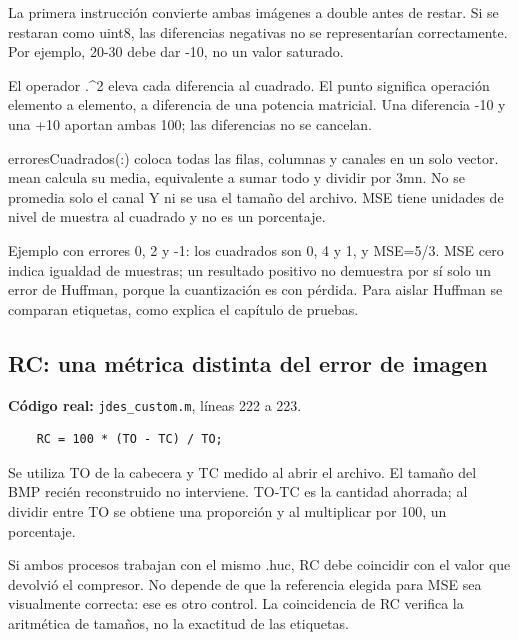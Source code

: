 \documentclass[11pt,a4paper,oneside]{report}
\begin{document}
La primera instrucción convierte ambas imágenes a double antes de restar.
Si se restaran como uint8, las diferencias negativas no se representarían
correctamente. Por ejemplo, 20-30 debe dar -10, no un valor saturado.

El operador .\^{}2 eleva cada diferencia al cuadrado. El punto significa
operación elemento a elemento, a diferencia de una potencia matricial.
Una diferencia -10 y una +10 aportan ambas 100; las diferencias no se cancelan.

erroresCuadrados(:) coloca todas las filas, columnas y canales en un solo
vector. mean calcula su media, equivalente a sumar todo y dividir por 3mn.
No se promedia solo el canal Y ni se usa el tamaño del archivo. MSE tiene
unidades de nivel de muestra al cuadrado y no es un porcentaje.

Ejemplo con errores 0, 2 y -1: los cuadrados son 0, 4 y 1, y MSE=5/3.
MSE cero indica igualdad de muestras; un resultado positivo no demuestra
por sí solo un error de Huffman, porque la cuantización es con pérdida.
Para aislar Huffman se comparan etiquetas, como explica el capítulo de pruebas.


\par\medskip\noindent\begin{minipage}{\linewidth}

\subsection{RC: una métrica distinta del error de imagen}

\textbf{Código real:} \texttt{jdes\_custom.m}, líneas 222 a 223.

\begin{lstlisting}[firstnumber=222]
    % PASO 14: calcular el porcentaje de espacio ahorrado.
    RC = 100 * (TO - TC) / TO;
\end{lstlisting}

\end{minipage}\par


Se utiliza TO de la cabecera y TC medido al abrir el archivo. El tamaño del
BMP recién reconstruido no interviene. TO-TC es la cantidad ahorrada; al
dividir entre TO se obtiene una proporción y al multiplicar por 100, un porcentaje.

Si ambos procesos trabajan con el mismo .huc, RC debe coincidir con el valor
que devolvió el compresor. No depende de que la referencia elegida para
MSE sea visualmente correcta: ese es otro control. La coincidencia de RC
verifica la aritmética de tamaños, no la exactitud de las etiquetas.
\end{document}
